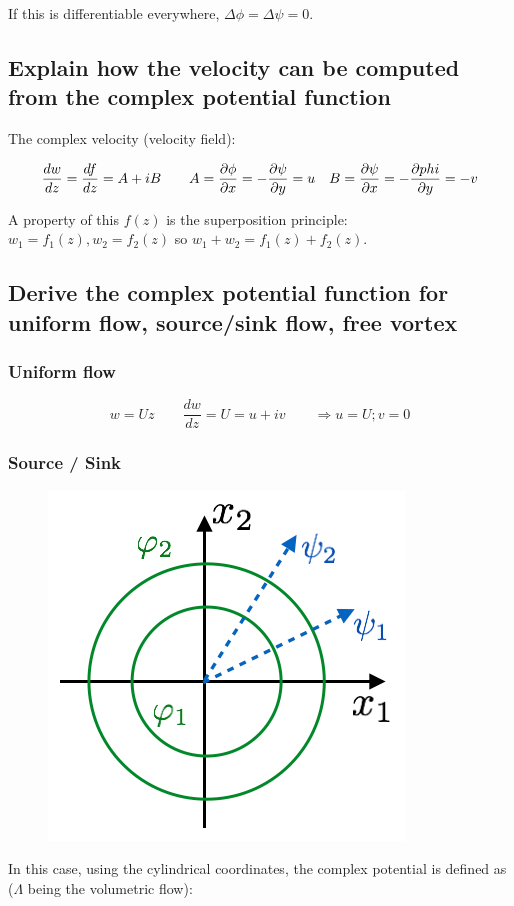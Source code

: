 \documentclass[british,french,11pt, a4paper, openany]{article}
\begin{document}
If this is differentiable everywhere, $\Delta \phi = \Delta \psi = 0$. 

\subsection{Explain how the velocity can be computed from the complex potential
	function}

The complex velocity (velocity field):

\begin{equation}
\frac{dw}{dz} = \frac{df}{dz} = A + iB \qquad A = \frac{\D \phi}{\D x} = - \frac{\D \psi}{\D y} = u \quad B = \frac{\D \psi}{\D x} = - \frac{\D phi}{\D y} = -v
\end{equation}

A property of this $f(z)$ is the superposition principle: $w_1 = f_1(z), w_2 = f_2(z)$ so $w_1 + w_2 = f_1(z)+f_2(z)$.
\subsection{Derive the complex potential function for uniform flow, source/sink flow,
	free vortex}
\subsubsection{Uniform flow}

\begin{equation}
w = U z \qquad \frac{d w}{dz} = U = u+iv \qquad \Rightarrow u = U; v = 0
\end{equation}

\subsubsection{Source / Sink}
\begin{figure}
	\vspace{-5mm}
	\includegraphics[scale=0.3]{ch2/25}
\end{figure}
In this case, using the cylindrical coordinates, the complex potential is defined as ($\Lambda$ being the volumetric flow): 
\end{document}
